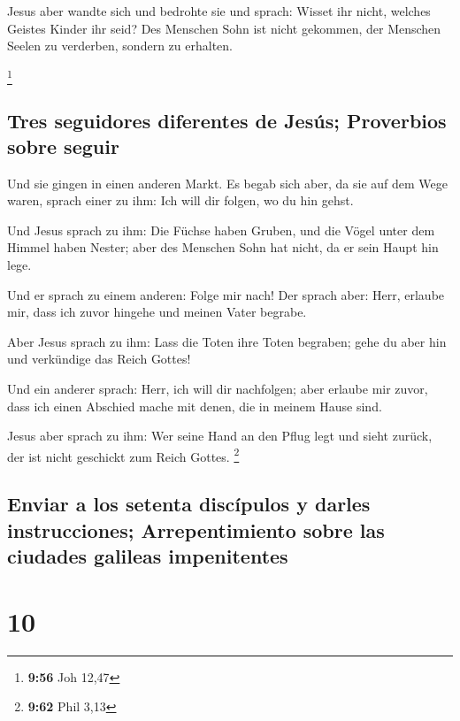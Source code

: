  Jesus aber wandte sich und bedrohte sie und sprach:
Wisset ihr nicht, welches Geistes Kinder ihr seid?  Des
Menschen Sohn ist nicht gekommen, der Menschen Seelen zu verderben,
sondern zu erhalten.

\footnote{\textbf{9:56} Joh 12,47}

\hypertarget{tres-seguidores-diferentes-de-jesuxfas-proverbios-sobre-seguir}{%
\subsection{Tres seguidores diferentes de Jesús; Proverbios sobre
seguir}\label{tres-seguidores-diferentes-de-jesuxfas-proverbios-sobre-seguir}}

 Und sie gingen in einen anderen Markt. Es begab sich
aber, da sie auf dem Wege waren, sprach einer zu ihm: Ich will dir
folgen, wo du hin gehst.

 Und Jesus sprach zu ihm: Die Füchse haben Gruben, und
die Vögel unter dem Himmel haben Nester; aber des Menschen Sohn hat
nicht, da er sein Haupt hin lege.

 Und er sprach zu einem anderen: Folge mir nach! Der
sprach aber: Herr, erlaube mir, dass ich zuvor hingehe und meinen Vater
begrabe.

 Aber Jesus sprach zu ihm: Lass die Toten ihre Toten
begraben; gehe du aber hin und verkündige das Reich Gottes!

 Und ein anderer sprach: Herr, ich will dir nachfolgen;
aber erlaube mir zuvor, dass ich einen Abschied mache mit denen, die in
meinem Hause sind.

 Jesus aber sprach zu ihm: Wer seine Hand an den Pflug
legt und sieht zurück, der ist nicht geschickt zum Reich Gottes.
\footnote{\textbf{9:62} Phil 3,13}

\hypertarget{enviar-a-los-setenta-discuxedpulos-y-darles-instrucciones-arrepentimiento-sobre-las-ciudades-galileas-impenitentes}{%
\subsection{Enviar a los setenta discípulos y darles instrucciones;
Arrepentimiento sobre las ciudades galileas
impenitentes}\label{enviar-a-los-setenta-discuxedpulos-y-darles-instrucciones-arrepentimiento-sobre-las-ciudades-galileas-impenitentes}}

\hypertarget{section-9}{%
\section{10}\label{section-9}}


